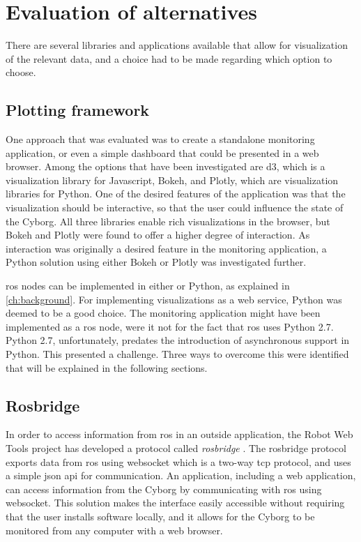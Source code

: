 \documentclass[\rootfolder/main.tex]{subfiles}
\begin{document}

\section{Evaluation of alternatives}

There are several libraries and applications available that allow for visualization of the relevant data, and a choice had to be made regarding which option to choose.

\subsection{Plotting framework}

One approach that was evaluated was to create a standalone monitoring application, or even a simple dashboard that could be presented in a web browser.
Among the options that have been investigated are d3, which is a visualization library for Javascript, Bokeh, and Plotly, which are visualization libraries for Python.
One of the desired features of the application was that the visualization should be interactive, so that the user could influence the state of the Cyborg.
All three libraries enable rich visualizations in the browser, but Bokeh and Plotly were found to offer a higher degree of interaction.
As interaction was originally a desired feature in the monitoring application, a Python solution using either Bokeh or Plotly was investigated further.

\acrshort{ros} nodes can be implemented in either \CC or Python, as explained in \cref{ch:background}.
For implementing visualizations as a web service, Python was deemed to be a good choice.
The monitoring application might have been implemented as a \acrshort{ros} node, were it not for the fact that \acrshort{ros} uses Python 2.7. Python 2.7, unfortunately, predates the introduction of asynchronous support in Python.
This presented a challenge.
Three ways to overcome this were identified that will be explained in the following sections.

\subsection{Rosbridge}

In order to access information from \acrshort{ros} in an outside application, the Robot Web Tools project has developed a protocol called \emph{rosbridge} \cite{Toris}.
The rosbridge protocol exports data from \acrshort{ros} using websocket which is a two-way \acrshort{tcp} protocol, and uses a simple \acrshort{json} \acrshort{api} for communication.
An application, including a web application, can access information from the Cyborg by communicating with \acrshort{ros} using websocket.
This solution makes the interface easily accessible without requiring that the user installs software locally, and it allows for the Cyborg to be monitored from any computer with a web browser.
\end{document}
